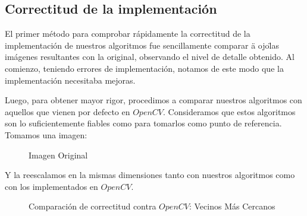 \subsection{Correctitud de la implementación}

El primer método para comprobar rápidamente la correctitud de la implementación de nuestros algoritmos fue sencillamente comparar \"a ojo\" las imágenes resultantes con la original, observando el nivel de detalle obtenido. Al comienzo, teniendo errores de implementación, notamos de este modo que la implementación necesitaba mejoras.

Luego, para obtener mayor rigor, procedimos a comparar nuestros algoritmos con aquellos que vienen por defecto en $OpenCV$. Consideramos que estos algoritmos son lo suficientemente fiables como para tomarlos como punto de referencia. Tomamos una imagen:
\begin{figure}[H]
    \centering
{}
\caption{Imagen Original}
\end{figure}
Y la reescalamos en la mismas dimensiones tanto con nuestros algoritmos como con los implementados en $OpenCV$.

\begin{figure}[H]
    \centering
    \qquad
    \caption{Comparación de correctitud contra $OpenCV$: Vecinos Más Cercanos}
\end{figure}

